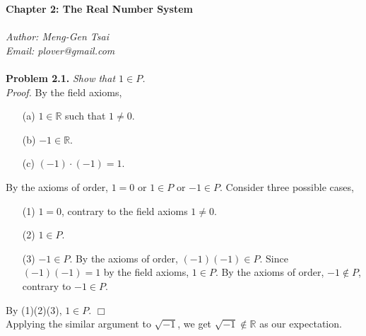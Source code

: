 \documentclass{article}
\begin{document}
\textbf{\Large Chapter 2: The Real Number System} \\\\



\emph{Author: Meng-Gen Tsai} \\
\emph{Email: plover@gmail.com} \\\\



\textbf{Problem 2.1.}
\emph{Show that $1 \in P$.} \\

\emph{Proof.}
By the field axioms,
\begin{enumerate}
\item[(a)]
$1 \in \mathbb{R}$ such that $1 \neq 0$.
\item[(b)]
$-1 \in \mathbb{R}$.
\item[(c)]
$(-1) \cdot (-1) = 1$.
\end{enumerate}

By the axioms of order,
$1 = 0$ or $1 \in P$ or $-1 \in P$.
Consider three possible cases,
\begin{enumerate}
\item[(1)]
$1 = 0$, contrary to the field axioms $1 \neq 0$.
\item[(2)]
$1 \in P$.
\item[(3)]
$-1 \in P$.
By the axioms of order, $(-1)(-1) \in P$.
Since $(-1)(-1) = 1$ by the field axioms, $1 \in P$.
By the axioms of order, $-1 \not\in P$, contrary to $-1 \in P$.
\end{enumerate}
By (1)(2)(3), $1 \in P$.
$\Box$ \\

Applying the similar argument to $\sqrt{-1}$,
we get $\sqrt{-1} \not\in \mathbb{R}$
as our expectation. \\\\
\end{document}

